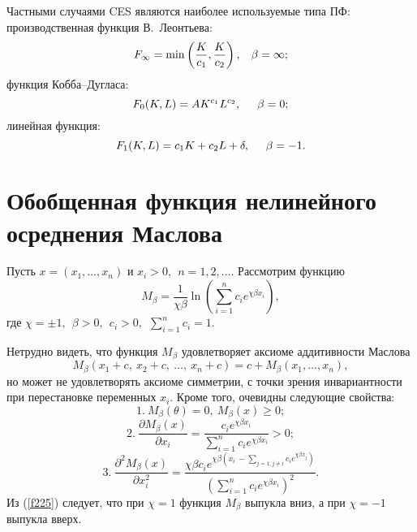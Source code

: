 \documentclass[12pt,openbib]{report}
\begin{document}
Частными случаями CES являются наиболее используемые типа ПФ: производственная функция В.~Леонтьева:
\begin{equation}\label{f215}
F_\infty=\min\left(\frac K{c_1},\frac K{c_2}\right),\hspace{3mm}\beta=\infty;
\end{equation}
функция Кобба--Дугласа:
\begin{equation}\label{f216}
F_0(K,L)=AK^{c_1}L^{c_2},\hspace{5mm}\beta=0;
\end{equation}
линейная функция:
\begin{equation}\label{f217}
F_1(K,L)=c_1K+c_2L+\delta,\hspace{5mm}\beta=-1.
\end{equation}



\section{Обобщенная функция нелинейного осреднения Маслова}


Пусть $x=(x_1,\ldots,x_n)$ и $x_i>0, \ \ n=1,2,\ldots$. Рассмотрим функцию
\begin{equation}\label{f221}
M_{\beta}=\frac1{\chi \beta} \ln \left( \sum\limits^n_{i=1} c_i e^{\chi\beta x_i} \right), %
\end{equation}
где $\chi=\pm1, \ \ \beta>0, \ \ c_i>0, \ \ \sum\limits^n_{i=1} c_i =1$.

Нетрудно видеть, что функция $M_{\beta}$ удовлетворяет аксиоме аддитивности Маслова
\begin{equation}\label{f222}
M_\beta(x_1+c,\ x_2+c, \ \ldots , \ x_n+c)=c+M_\beta(x_1,\ldots, x_n),%
\end{equation}
но может не удовлетворять аксиоме симметрии, с точки зрения инвариантности при перестановке переменных $x_i$. Кроме того, очевидны следующие свойства:
\begin{equation}\label{f223}
1. \ M_\beta(\theta)=0, \ M_\beta(x)\geq 0; %
\end{equation}
\begin{equation}\label{f22}
2. \ \frac{\partial M_\beta(x)}{\partial x_i}=\frac{c_i e^{\chi
\beta x_i}}{\sum\limits_{i=1}^n c_i e^{\chi \beta x_i}} > 0;
\end{equation}
\begin{equation}\label{f225}
3. \ \frac{\partial^2 M_\beta(x)}{\partial x_i^2}=\frac{\chi \beta
c_i e^{\chi \beta ( x_i \ - \sum\limits_{j=1, j\neq i} c_i e^{\chi
\beta x_j})}}{\left(\sum\limits_{i=1}^n c_i e^{\chi \beta
x_i}\right)^2}.%
\end{equation}
Из (\ref{f225}) следует, что при $\chi=1$ функция $ M_\beta$ выпукла вниз, а при $\chi=-1$ выпукла вверх.
\end{document}
